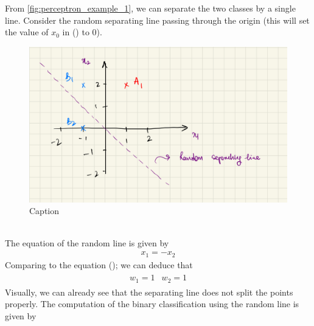 From \ref{fig:perceptron_example_1}, we can separate the two classes by a single line. Consider the random separating line passing through the origin (this will set the value of $x_0$ in () to 0).\\
\begin{figure}[!htbp]
  \centering
  \includegraphics[scale=0.15]{CHAPTER_2/c2_fig_perceptron_example_2.jpeg}
  \caption{Caption}
  \label{fig:perceptron_example_2}
\end{figure}\\
The equation of the random line is given by
\begin{align}
  x_1 = - x_2
\end{align}
Comparing to the equation (); we can deduce that 
\begin{align}
  \begin{matrix}
    w_1 = 1 & w_2 = 1
  \end{matrix}
\end{align}
Visually, we can already see that the separating line does not split the points properly. The computation of the binary classification using the random line is given by
